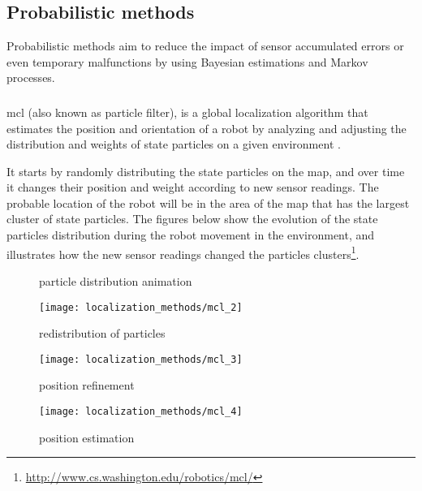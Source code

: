 \subsection{Probabilistic methods}

Probabilistic methods aim to reduce the impact of sensor accumulated errors or even temporary malfunctions by using Bayesian estimations and Markov processes.


\subsubsection{}

\gls{mcl} (also known as particle filter), is a global localization algorithm that estimates the position and orientation of a robot by analyzing and adjusting the distribution and weights of state particles on a given environment \cite{Bshara2010,Arulampalam2002,Blanco2010,Chen2003b,Fox1999,Saito2009}.

It starts by randomly distributing the state particles on the map, and over time it changes their position and weight according to new sensor readings. The probable location of the robot will be in the area of the map that has the largest cluster of state particles. The figures below show the evolution of the state particles distribution during the robot movement in the environment, and illustrates how the new sensor readings changed the particles clusters\footnote{\url{http://www.cs.washington.edu/robotics/mcl/}}.

\begin{figure}[H]
	\centering
	\begin{minipage}[h]{.49\textwidth}
		\centering
		\caption{ particle distribution animation}
		\label{fig:localization-methods_mcl1}
	\end{minipage}\hfill
	\begin{minipage}[h]{.49\textwidth}
		\centering
		\texttt{[image: localization\_methods/mcl\_2]}
		\caption{ redistribution of particles}
		\label{fig:localization-methods_mcl2}
	\end{minipage}
\end{figure}

\begin{figure}[H]
	\centering
	\begin{minipage}[h]{.49\textwidth}
		\centering
		\texttt{[image: localization\_methods/mcl\_3]}
		\caption{ position refinement}
		\label{fig:localization-methods_mcl3}
	\end{minipage}\hfill
	\begin{minipage}[h]{.49\textwidth}
		\centering
		\texttt{[image: localization\_methods/mcl\_4]}
		\caption{ position estimation}
		\label{fig:localization-methods_mcl4}
	\end{minipage}
\end{figure}


